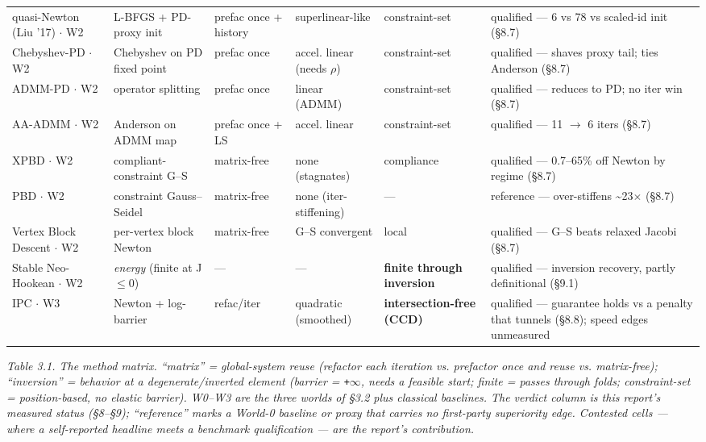 \documentclass{egpubl}
\begin{document}
\begin{table}[t]
\begin{tabularx}{\textwidth}{lYYYYY}
quasi-Newton (Liu '17) $\cdot$ W2 & L-BFGS + PD-proxy init & prefac once + history & superlinear-like & constraint-set & qualified --- 6 vs 78 vs scaled-id init (\S8.7) \\
Chebyshev-PD $\cdot$ W2 & Chebyshev on PD fixed point & prefac once & accel. linear (needs $\rho$) & constraint-set & qualified --- shaves proxy tail; ties Anderson (\S8.7) \\
ADMM-PD $\cdot$ W2 & operator splitting & prefac once & linear (ADMM) & constraint-set & qualified --- reduces to PD; no iter win (\S8.7) \\
AA-ADMM $\cdot$ W2 & Anderson on ADMM map & prefac once + LS & accel. linear & constraint-set & qualified --- 11 $\rightarrow$ 6 iters (\S8.7) \\
XPBD $\cdot$ W2 & compliant-constraint G--S & matrix-free & none (stagnates) & compliance & qualified --- 0.7--65\% off Newton by regime (\S8.7) \\
PBD $\cdot$ W2 & constraint Gauss--Seidel & matrix-free & none (iter-stiffening) & --- & reference --- over-stiffens \textasciitilde{}23$\times$ (\S8.7) \\
Vertex Block Descent $\cdot$ W2 & per-vertex block Newton & matrix-free & G--S convergent & local & qualified --- G--S beats relaxed Jacobi (\S8.7) \\
Stable Neo-Hookean $\cdot$ W2 & \emph{energy} (finite at J$\le$0) & --- & --- & \textbf{finite through inversion} & qualified --- inversion recovery, partly definitional (\S9.1) \\
IPC $\cdot$ W3 & Newton + log-barrier & refac/iter & quadratic (smoothed) & \textbf{intersection-free (CCD)} & qualified --- guarantee holds vs a penalty that tunnels (\S8.8); speed edges unmeasured \\
\bottomrule\end{tabularx}\end{table}

\emph{Table 3.1. The method matrix. ``matrix'' = global-system reuse (refactor each iteration vs. prefactor
once and reuse vs. matrix-free); ``inversion'' = behavior at a degenerate/inverted element (barrier =
\texttt{+$\infty$}, needs a feasible start; finite = passes through folds; constraint-set = position-based, no
elastic barrier). W0--W3 are the three worlds of \S3.2 plus classical baselines. The verdict column is
this report's measured status (\S8--\S9); ``reference'' marks a World-0 baseline or proxy that carries no
first-party superiority edge. Contested cells --- where a self-reported headline meets a benchmark
qualification --- are the report's contribution.}
\end{document}
